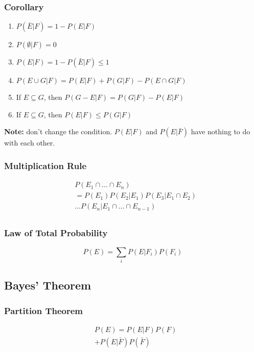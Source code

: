 \subsubsection*{Corollary}

\begin{enumerate}
      \item $P(\bar{E}|F) = 1 - P(E|F)$
      \item $P(\emptyset|F) = 0$
      \item $P(E|F) = 1 - P(\bar{E}|F) \leq 1$
      \item $P(E \cup G|F) = P(E|F) + P(G|F) - P(E \cap G|F)$
      \item If $E \subseteq G$, then $P(G-E|F)=P(G|F)-P(E|F)$
      \item If $E \subseteq G$, then $P(E|F) \leq P(G|F)$
\end{enumerate}

\textbf{Note:} don't change the condition. $P(E|F)$ and $P(E|\bar{F})$ have nothing to do with each other.

\subsubsection*{Multiplication Rule}

\begin{align*}
       & P(E_1 \cap \dots \cap E_n)               \\
       & = P(E_1)P(E_2|E_1)P(E_3|E_1 \cap E_2)    \\
       & \dots P(E_n|E_1 \cap \dots \cap E_{n-1}) \\
\end{align*}

\subsubsection*{Law of Total Probability}

$$ P(E) = \sum_{i} P(E|F_i)P(F_i) $$

\subsection*{Bayes' Theorem}

\subsubsection*{Partition Theorem}

\begin{align*}
       & P(E) = P(E|F)P(F)        \\
       & + P(E|\bar{F})P(\bar{F}) \\
\end{align*}

